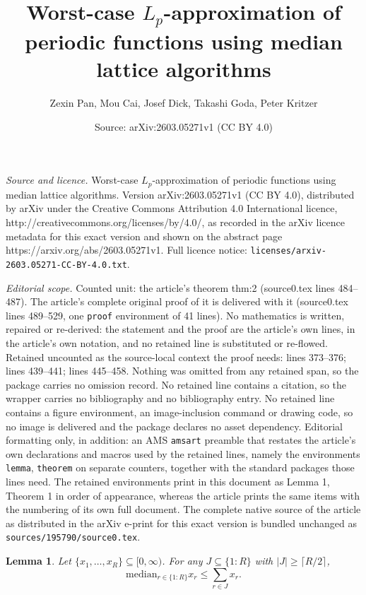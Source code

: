 \documentclass[10pt,a4paper]{amsart}
\title{Worst-case $L_p$-approximation of periodic functions using median lattice algorithms}
\author{Zexin Pan, Mou Cai, Josef Dick, Takashi Goda, Peter Kritzer}
\date{Source: arXiv:2603.05271v1 (CC BY 4.0)}
\newtheorem{lemma}{Lemma}
\begin{document}
\maketitle

\noindent\emph{Source and licence.} Worst-case $L_p$-approximation of periodic functions using median lattice algorithms. Version arXiv:2603.05271v1 (CC BY 4.0), distributed by arXiv under the Creative Commons Attribution 4.0 International licence, http://creativecommons.org/licenses/by/4.0/, as recorded in the arXiv licence metadata for this exact version and shown on the abstract page https://arxiv.org/abs/2603.05271v1. Full licence notice: \texttt{licenses/arxiv-2603.05271-CC-BY-4.0.txt}.\par\smallskip

\noindent\textit{Editorial scope.} Counted unit: the article's theorem thm:2 (source0.tex lines 484--487). The article's complete original proof of it is delivered with it (source0.tex lines 489--529, one \texttt{proof} environment of 41 lines). No mathematics is written, repaired or re-derived: the statement and the proof are the article's own lines, in the article's own notation, and no retained line is substituted or re-flowed.  Retained uncounted as the source-local context the proof needs: lines 373--376; lines 439--441; lines 445--458.  Nothing was omitted from any retained span, so the package carries no omission record.  No retained line contains a citation, so the wrapper carries no bibliography and no bibliography entry.  No retained line contains a figure environment, an image-inclusion command or drawing code, so no image is delivered and the package declares no asset dependency.  Editorial formatting only, in addition: an AMS \texttt{amsart} preamble that restates the article's own declarations and macros used by the retained lines, namely the environments \texttt{lemma}, \texttt{theorem} on separate counters, together with the standard packages those lines need.  The retained environments print in this document as Lemma 1, Theorem 1 in order of appearance, whereas the article prints the same items with the numbering of its own full document.  The complete native source of the article as distributed in the arXiv e-print for this exact version is bundled unchanged as \texttt{sources/195790/source0.tex}.
\begin{lemma}\label{lem:medtosum}
    Let $\{x_1,\dots,x_R\}\subseteq [0,\infty)$. For any $J\subseteq \{1{:}R\}$ with $|J|\geq \lceil R/2 \rceil$,
    $$\mathrm{median}_{r\in\{1{:}R\}} x_r \leq \sum_{r\in J} x_r.$$
\end{lemma}
\end{document}

